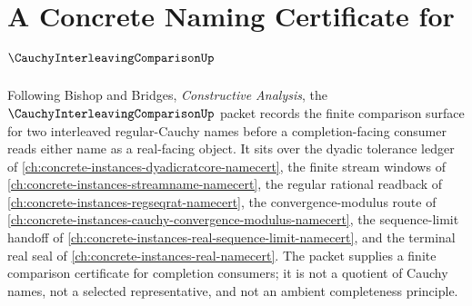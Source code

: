 \chapter{A Concrete Naming Certificate for $\CauchyInterleavingComparisonUp$}
\label{ch:concrete-instances-cauchy-interleaving-comparison-namecert}

Following Bishop and Bridges, \emph{Constructive Analysis}, the $\CauchyInterleavingComparisonUp$ packet records the finite comparison surface for two interleaved regular-Cauchy names before a completion-facing consumer reads either name as a real-facing object. It sits over the dyadic tolerance ledger of \autoref{ch:concrete-instances-dyadicratcore-namecert}, the finite stream windows of \autoref{ch:concrete-instances-streamname-namecert}, the regular rational readback of \autoref{ch:concrete-instances-regseqrat-namecert}, the convergence-modulus route of \autoref{ch:concrete-instances-cauchy-convergence-modulus-namecert}, the sequence-limit handoff of \autoref{ch:concrete-instances-real-sequence-limit-namecert}, and the terminal real seal of \autoref{ch:concrete-instances-real-namecert}. The packet supplies a finite comparison certificate for completion consumers; it is not a quotient of Cauchy names, not a selected representative, and not an ambient completeness principle.

